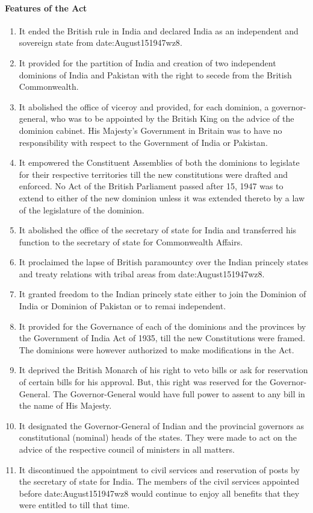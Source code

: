 \paragraph{Features of the Act}
\begin{enumerate}
  \item It ended the British rule in India and declared India as an independent and sovereign state from \gls{date:August151947wz8}.
  \item It provided for the partition of India and creation of two independent dominions of India and Pakistan with the right to secede from the British Commonwealth.
  \item It abolished the office of viceroy and provided, for each dominion, a governor-general, who was to be appointed by the British King on the advice of the dominion cabinet. His Majesty's Government in Britain was to have no responsibility with respect to the Government of India or Pakistan.
  \item It empowered the Constituent Assemblies of both the dominions to legislate for their respective territories till the new constitutions were drafted and enforced. No Act of the British Parliament passed after 15, 1947 was to extend to either of the new dominion unless it was extended thereto by a law of the legislature of the dominion.
  \item It abolished the office of the secretary of state for India and transferred his function to the secretary of state for Commonwealth Affairs.
  \item It proclaimed the lapse of British paramountcy over the Indian princely states and treaty relations with tribal areas from \gls{date:August151947wz8}.
  \item It granted freedom to the Indian princely state either to join the Dominion of India or Dominion of Pakistan or to remai independent.
  \item It provided for the Governance of each of the dominions and the provinces by the Government of India Act of 1935, till the new Constitutions were framed. The dominions were however authorized to make modifications in the Act.
  \item It deprived the British Monarch of his right to veto bills or ask for reservation of certain bills for his approval. But, this right was reserved for the Governor-General. The Governor-General would have full power to assent to any bill in the name of His Majesty.
  \item It designated the Governor-General of Indian and the provincial governors as constitutional (nominal) heads of the states. They were made to act on the advice of the respective council of ministers in all matters.
  \item It discontinued the appointment to civil services and reservation of posts by the secretary of state for India. The members of the civil services appointed before \gls{date:August151947wz8} would continue to enjoy all benefits that they were entitled to till that time.
\end{enumerate}


